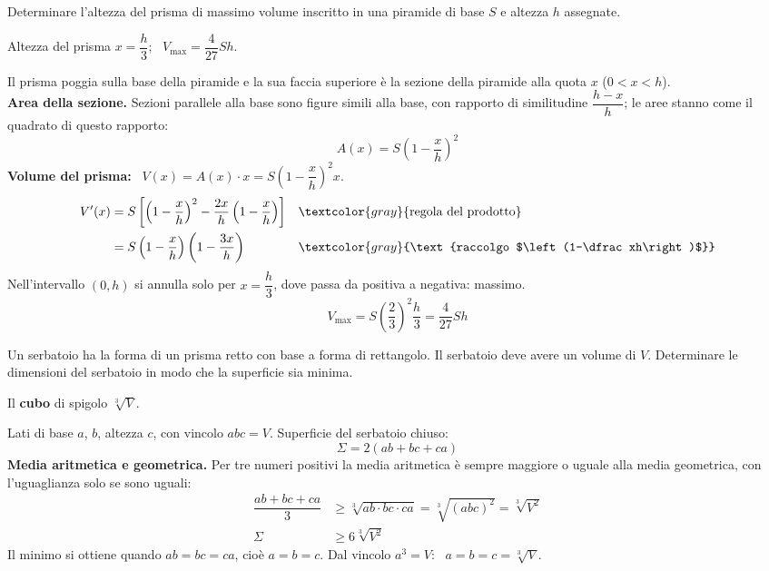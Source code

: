 \begin{question}[ID=2.4, subtitle={Prisma di massimo volume inscritto in una piramide}, tags={ottimizzazione, geometria, solidi}, difficulty=difficile]
Determinare l'altezza del prisma di massimo volume inscritto in una piramide di base \(S\) e altezza \(h\) assegnate.
\begin{solution}
Altezza del prisma $x=\dfrac h3$; \ $V_{\max}=\dfrac{4}{27}Sh$.
\end{solution}
\begin{explanation}
Il prisma poggia sulla base della piramide e la sua faccia superiore è la sezione della piramide alla quota $x$ ($0<x<h$). \\
\textbf{Area della sezione.} Sezioni parallele alla base sono figure simili alla base, con rapporto di similitudine $\dfrac{h-x}{h}$; le aree stanno come il quadrato di questo rapporto:
\[ A(x)=S\left(1-\dfrac xh\right)^2 \]
\textbf{Volume del prisma:} \ $V(x)=A(x)\cdot x=S\left(1-\dfrac xh\right)^2x$.
\[\begin{aligned}
V'(x) &= S\left[\left(1-\dfrac xh\right)^2-\dfrac{2x}{h}\left(1-\dfrac xh\right)\right] && \textcolor{gray}{\text{regola del prodotto}}\\
&= S\left(1-\dfrac xh\right)\left(1-\dfrac{3x}{h}\right) && \textcolor{gray}{\text{raccolgo $\left(1-\dfrac xh\right)$}}
\end{aligned}\]
Nell'intervallo $(0,h)$ si annulla solo per $x=\dfrac h3$, dove passa da positiva a negativa: massimo.
\[ V_{\max}=S\left(\dfrac23\right)^2\dfrac h3=\dfrac{4}{27}Sh \]
\end{explanation}
\end{question}


\begin{question}[ID=2.5, subtitle={Serbatoio prismatico di minima superficie a volume fissato}, tags={ottimizzazione, geometria, solidi}, difficulty=media]
Un serbatoio ha la forma di un prisma retto con base a forma di rettangolo. Il serbatoio deve avere un volume di $V$. Determinare le dimensioni del serbatoio in modo che la superficie sia minima.
\begin{solution}
Il \textbf{cubo} di spigolo $\sqrt[3]{V}$.
\end{solution}
\begin{explanation}
Lati di base $a$, $b$, altezza $c$, con vincolo $abc=V$. Superficie del serbatoio chiuso:
\[ \Sigma=2(ab+bc+ca) \]
\textbf{Media aritmetica e geometrica.} Per tre numeri positivi la media aritmetica è sempre maggiore o uguale alla media geometrica, con l'uguaglianza solo se sono uguali:
\[\begin{aligned}
\dfrac{ab+bc+ca}{3} &\geq \sqrt[3]{ab\cdot bc\cdot ca}=\sqrt[3]{(abc)^2}=\sqrt[3]{V^2}\\
\Sigma &\geq 6\sqrt[3]{V^2}
\end{aligned}\]
Il minimo si ottiene quando $ab=bc=ca$, cioè $a=b=c$. Dal vincolo $a^3=V$: \ $a=b=c=\sqrt[3]V$.
\end{explanation}
\end{question}

